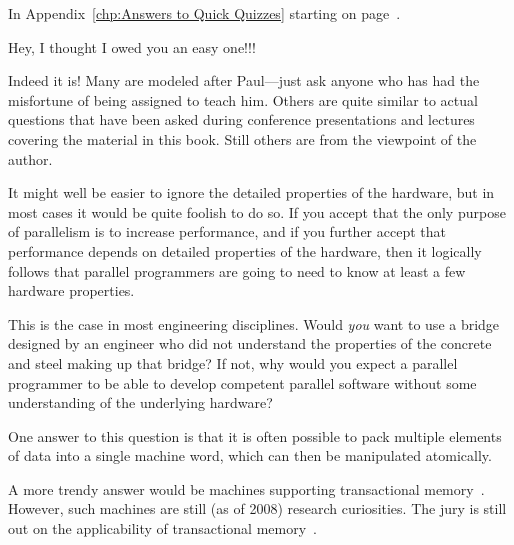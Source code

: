 
	In Appendix~\ref{chp:Answers to Quick Quizzes} starting on
	page~\pageref{chp:Answers to Quick Quizzes}.

	Hey, I thought I owed you an easy one!!!


	Indeed it is!
 	Many are modeled after Paul---just ask anyone who has had the
	misfortune of being assigned to teach him.
	Others are quite similar to actual questions that have been asked
	during conference presentations and lectures covering the
	material in this book.
	Still others are from the viewpoint of the author.


	It might well be easier to ignore the detailed properties of
	the hardware, but in most cases it would be quite foolish
	to do so.
	If you accept that the only purpose of parallelism is to
	increase performance, and if you further accept that
	performance depends on detailed properties of the hardware,
	then it logically follows that parallel programmers are going
	to need to know at least a few hardware properties.

	This is the case in most engineering disciplines.
	Would \emph{you} want to use a bridge designed by an
	engineer who did not understand the properties of
	the concrete and steel making up that bridge?
	If not, why would you expect a parallel programmer to be
	able to develop competent parallel software without some
	understanding of the underlying hardware?


	One answer to this question is that it is often possible to
	pack multiple elements of data into a single machine word,
	which can then be manipulated atomically.

	A more trendy answer would be machines supporting transactional
	memory~\cite{DBLomet1977SIGSOFT}.
	However, such machines are still (as of 2008) research
	curiosities.
	The jury is still out on the applicability of transactional
	memory~\cite{McKenney2007PLOSTM,DonaldEPorter2007TRANSACT,
	ChistopherJRossbach2007a}.

